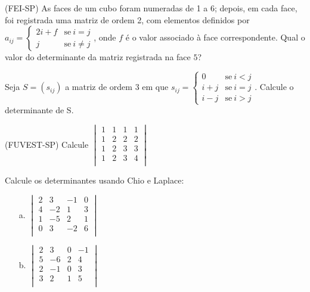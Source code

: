 \documentclass[pdftex, brazil, 12pt, oneside, addpoints]{exam}
\begin{document}
\begin{questions}

\question
(FEI-SP) As faces de um cubo foram numeradas de 1 a 6; depois, em cada face, foi
registrada uma matriz de ordem 2, com elementos definidos por
$a_{ij} =
    \begin{cases}
      2i + f & \text{se}\ i = j\\
      j      & \text{se}\ i \ne j
    \end{cases}
$, onde $f$ é o valor associado à face correspondente. Qual o valor do determinante
da matriz registrada na face $5$?

\question
Seja $S = (s_{ij})$ a matriz de ordem $3$ em que
$s_{ij} =
\begin{cases}
  0     & \text{se}\ i < j\\
  i + j & \text{se}\ i = j\\
  i - j & \text{se}\ i > j
\end{cases}
$. Calcule o determinante de S.

\question
(FUVEST-SP) Calcule
$\begin{vmatrix}
  1 & 1 & 1 & 1\\
  1 & 2 & 2 & 2\\
  1 & 2 & 3 & 3\\
  1 & 2 & 3 & 4\\
\end{vmatrix}$

\question
Calcule os determinantes usando Chio e Laplace:
\begin{itemize}
\item[a.]
$\begin{vmatrix}
  2 &  3 & -1 & 0\\
  4 & -2 &  1 & 3\\
  1 & -5 &  2 & 1\\
  0 &  3 & -2 & 6\\
\end{vmatrix}$  
\item[b.]
$\begin{vmatrix}
  2 &  3 & 0 & -1\\
  5 & -6 & 2 &  4\\
  2 & -1 & 0 &  3\\
  3 &  2 & 1 &  5\\
\end{vmatrix}$
\end{itemize}



\end{questions}
\end{document}
